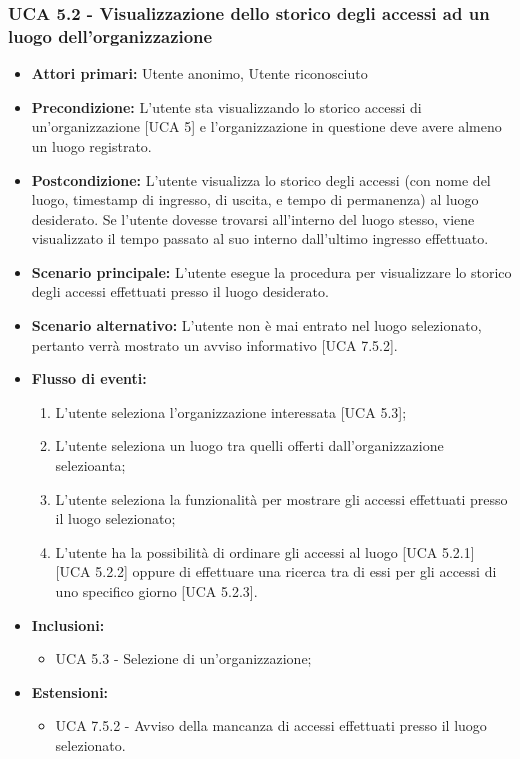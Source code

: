 \subsubsection{UCA 5.2 - Visualizzazione dello storico degli accessi ad un luogo dell'organizzazione}
\begin{itemize}
    \item \textbf{Attori primari:} Utente anonimo, Utente riconosciuto
    \item \textbf{Precondizione:} L'utente sta visualizzando lo storico accessi di un'organizzazione [UCA 5] e l'organizzazione in questione deve avere almeno un luogo registrato.
    \item \textbf{Postcondizione:} L'utente visualizza lo storico degli accessi (con nome del luogo, timestamp di ingresso, di uscita, e tempo di permanenza) al luogo desiderato. Se l'utente dovesse trovarsi all'interno del luogo stesso, viene visualizzato il tempo passato al suo interno dall'ultimo ingresso effettuato.
    \item \textbf{Scenario principale:} L'utente esegue la procedura per visualizzare lo storico degli accessi effettuati presso il luogo desiderato.
    \item \textbf{Scenario alternativo:} L'utente non è mai entrato nel luogo selezionato, pertanto verrà mostrato un avviso informativo [UCA 7.5.2].
    \item \textbf{Flusso di eventi:}
    \begin{enumerate}
        \item L'utente seleziona l'organizzazione interessata [UCA 5.3];
        \item L'utente seleziona un luogo tra quelli offerti dall'organizzazione selezioanta;
        \item L'utente seleziona la funzionalità per mostrare gli accessi effettuati presso il luogo selezionato;
        \item L'utente ha la possibilità di ordinare gli accessi al luogo [UCA 5.2.1] [UCA 5.2.2] oppure di effettuare una ricerca tra di essi per gli accessi di uno specifico giorno [UCA 5.2.3].
    \end{enumerate}
    \item \textbf{Inclusioni:}
    \begin{itemize}
        \item UCA 5.3 - Selezione di un'organizzazione;
    \end{itemize}
    \item \textbf{Estensioni:}
    \begin{itemize}
        \item UCA 7.5.2 - Avviso della mancanza di accessi effettuati presso il luogo selezionato.
    \end{itemize}
\end{itemize}

